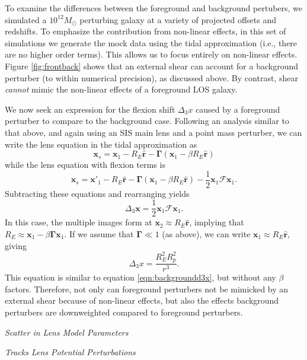 \documentclass{emulateapj}
\newcommand\GammaMat[0]{\boldsymbol{\Gamma}}
\newcommand\x[0]{\mathbf{x}}
\renewcommand\vec[1]{\mathbf{#1}}
\newcommand\rhat[0]{\vec{\hat{r}}}
\newcommand\sF{{\mathcal F}}
\begin{document}
To examine the differences between the foreground and background pertubers, we simulated a $10^{12} M_\odot$ perturbing galaxy at a variety of projected offsets and redshifts. To emphasize the contribution from non-linear effects, in this set of simulations we generate the mock data using the tidal approximation (i.e., there are no higher order terms). This allows us to focus entirely on non-linear effects.  Figure \ref{fig:frontback} shows that an external shear can account for a background perturber (to within numerical precision), as discussed above.  By contrast, shear \emph{cannot} mimic the non-linear effects of a foreground LOS galaxy.  

We now seek an expression for the flexion shift $\Delta_3 x$ caused by a foreground perturber to compare to the background case.  Following an analysis similar to that above, and again using an SIS main lens and a point mass perturber, we can write the lens equation in the tidal approximation as
\begin{equation}
\x_s = \x_1 - R_E \rhat - \GammaMat(\x_1 - \beta R_E \rhat) 
\end{equation}
while the lens equation with flexion terms is
\begin{equation}
\x_s = \x'_1 - R_E \rhat - \GammaMat(\x_1 - \beta R_E \rhat) - \frac{1}{2} \x_1 \sF \x_1.
\end{equation}
Subtracting these equations and rearranging yields
\begin{equation}
\Delta_3 \x = \frac{1}{2} \x_1 \sF \x_1.
\end{equation}
In this case, the multiple images form at $\x_2 \approx R_E \rhat$, implying that $R_E \approx \x_1 - \beta \GammaMat \x_1$. If we assume that $\GammaMat \ll 1$ (as above), we can write $\x_1 \approx R_E \rhat$, giving
\begin{equation}
\Delta_3 x = \frac{R_E^2 R_p^2}{r^3}.
\label{eqn:foregroundd3x}
\end{equation}
This equation is similar to equation \ref{eqn:backgroundd3x}, but without any $\beta$ factors. Therefore, not only can foreground perturbers not be mimicked by an external shear because of non-linear effects, but also the effects background perturbers are downweighted compared to foreground perturbers.

\medskip
\centerline{\emph{Scatter in Lens Model Parameters}}
\centerline{\emph{Tracks Lens Potential Perturbations}}
\medskip
\end{document}
